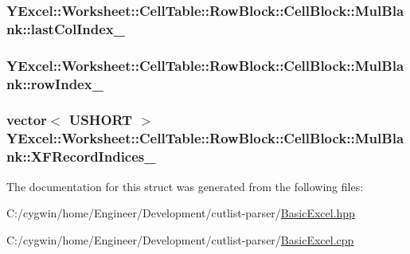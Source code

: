 \subsubsection[{last\+Col\+Index\+\_\+}]{ Y\+Excel\+::\+Worksheet\+::\+Cell\+Table\+::\+Row\+Block\+::\+Cell\+Block\+::\+Mul\+Blank\+::last\+Col\+Index\+\_\+}\label{struct_y_excel_1_1_worksheet_1_1_cell_table_1_1_row_block_1_1_cell_block_1_1_mul_blank_a86013cfd319b9e126b6efe2357059d39}
\hypertarget{struct_y_excel_1_1_worksheet_1_1_cell_table_1_1_row_block_1_1_cell_block_1_1_mul_blank_aed9db4125ab7dac604b2576be9293786}{}
\subsubsection[{row\+Index\+\_\+}]{ Y\+Excel\+::\+Worksheet\+::\+Cell\+Table\+::\+Row\+Block\+::\+Cell\+Block\+::\+Mul\+Blank\+::row\+Index\+\_\+}\label{struct_y_excel_1_1_worksheet_1_1_cell_table_1_1_row_block_1_1_cell_block_1_1_mul_blank_aed9db4125ab7dac604b2576be9293786}
\hypertarget{struct_y_excel_1_1_worksheet_1_1_cell_table_1_1_row_block_1_1_cell_block_1_1_mul_blank_a4d7329677aa02e6e3170002c8ee02420}{}
\subsubsection[{X\+F\+Record\+Indices\+\_\+}]{\setlength{\rightskip}{0pt plus 5cm}vector$<$ {\bf U\+S\+H\+O\+R\+T} $>$ Y\+Excel\+::\+Worksheet\+::\+Cell\+Table\+::\+Row\+Block\+::\+Cell\+Block\+::\+Mul\+Blank\+::\+X\+F\+Record\+Indices\+\_\+}\label{struct_y_excel_1_1_worksheet_1_1_cell_table_1_1_row_block_1_1_cell_block_1_1_mul_blank_a4d7329677aa02e6e3170002c8ee02420}


The documentation for this struct was generated from the following files\+:\begin{DoxyCompactItemize}
\item 
C\+:/cygwin/home/\+Engineer/\+Development/cutlist-\/parser/\hyperlink{_basic_excel_8hpp}{Basic\+Excel.\+hpp}\item 
C\+:/cygwin/home/\+Engineer/\+Development/cutlist-\/parser/\hyperlink{_basic_excel_8cpp}{Basic\+Excel.\+cpp}\end{DoxyCompactItemize}
